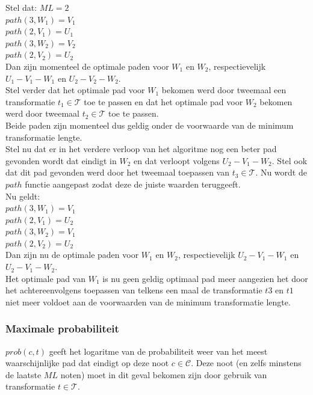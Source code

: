 \begin{framed}
\noindent
Stel dat:
$ML=2$\\
$path(3,W_1) = V_1$\\
$path(2,V_1) = U_1$\\
$path(3,W_2) = V_2$\\
$path(2,V_2) = U_2$\\
Dan zijn momenteel de optimale paden voor $W_1$ en $W_2$, respectievelijk $U_1-V_1-W_1$ en $U_2-V_2-W_2$.\\
Stel verder dat het optimale pad voor $W_1$ bekomen werd door tweemaal een transformatie $t_1 \in \mathcal{T}$ toe te passen en dat het optimale pad voor $W_2$ bekomen werd door tweemaal $t_2 \in \mathcal{T}$ toe te passen.\\
Beide paden zijn momenteel dus geldig onder de voorwaarde van de minimum transformatie lengte.\\
Stel nu dat er in het verdere verloop van het algoritme nog een beter pad gevonden wordt dat eindigt in $W_2$ en dat verloopt volgens $U_2-V_1-W_2$. Stel ook dat dit pad gevonden werd door het tweemaal toepassen van $t_3 \in \mathcal{T}$. Nu wordt de $path$ functie aangepast zodat deze de juiste waarden teruggeeft.\\
Nu geldt:\\
$path(3,W_1) = V_1$\\
$path(2,V_1) = U_2$\\
$path(3,W_2) = V_1$\\
$path(2,V_2) = U_2$\\
Dan zijn nu de optimale paden voor $W_1$ en $W_2$, respectievelijk $U_2-V_1-W_1$ en $U_2-V_1-W_2$.\\
Het optimale pad van $W_1$ is nu geen geldig optimaal pad meer aangezien het door het achtereenvolgens toepassen van telkens een maal de transformatie $t3$ en $t1$ niet meer voldoet aan de voorwaarden van de minimum transformatie lengte.
\end{framed}

\subsubsection{Maximale probabiliteit}
$prob(c,t)$ geeft het logaritme van de probabiliteit weer van het meest waarschijnlijke pad dat eindigt op deze noot $c\in \mathcal{C}$. Deze noot (en zelfs minstens de laatste $ML$ noten) moet in dit geval bekomen zijn door gebruik van transformatie $t \in \mathcal{T}$.

